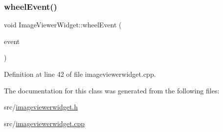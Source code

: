 \subsubsection{\texorpdfstring{wheelEvent()}{wheelEvent()}}
{\footnotesize\ttfamily void Image\+Viewer\+Widget\+::wheel\+Event (\begin{DoxyParamCaption}\item[{Q\+Wheel\+Event $\ast$}]{event }\end{DoxyParamCaption})\hspace{0.3cm}{\ttfamily [protected]}}



Definition at line 42 of file imageviewerwidget.\+cpp.



The documentation for this class was generated from the following files\+:\begin{DoxyCompactItemize}
\item 
src/\mbox{\hyperlink{imageviewerwidget_8h}{imageviewerwidget.\+h}}\item 
src/\mbox{\hyperlink{imageviewerwidget_8cpp}{imageviewerwidget.\+cpp}}\end{DoxyCompactItemize}
